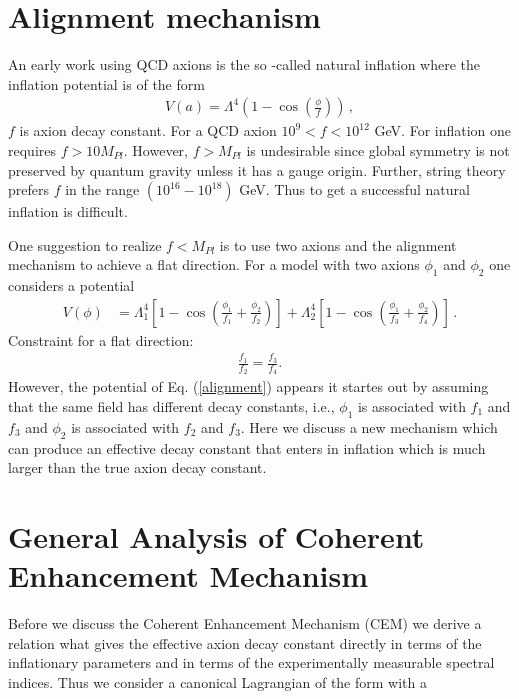 \documentclass[12pt]{article}
\begin{document}
\section{Alignment mechanism \label{sec2}}

An early work using QCD axions is the so -called natural inflation
where the inflation potential is of the form
\begin{align}
  V(a) = \Lambda^4 \left(1- \cos(\frac{\phi}{f})\right)\,,
\end{align}
$f $ is axion decay constant.
For a QCD axion $10^9 < f  <10^{12}$ GeV.
For inflation one requires $f> 10 M_{Pl}$. However,
$f>M_{Pl}$ is undesirable since  global symmetry is not preserved  by quantum gravity
unless it has a gauge origin.
Further, string theory prefers $f$ in the range $ (10^{16}-10^{18})$ GeV.
Thus to get a successful natural inflation is difficult.


One suggestion to realize $f< M_{Pl}$ is to use two axions and the alignment mechanism to achieve a flat direction.
For a model with two axions $\phi_1$ and $\phi_2$ one considers a potential
\begin{align}
  V(\phi) & = \Lambda^4_1 \left[1- \cos\left(\frac{\phi_1}{f_1} + \frac{\phi_2}{f_2}\right)\right]
  + \Lambda^4_2 \left[1- \cos\left(\frac{\phi_1}{f_3} + \frac{\phi_2}{f_4}\right)\right]\,.
  \label{alignment}
\end{align}
Constraint for a flat direction:
\begin{align}
  \frac{f_1}{f_2}= \frac{f_3}{f_4}.
\end{align}
However,  the potential of Eq. (\ref{alignment}) appears it startes out  by assuming that the same field
has different decay constants, i.e., $\phi_1$ is associated with $f_1$ and $f_3$ and $\phi_2$ is associated with
$f_2$ and $f_3$.  Here we discuss a new mechanism which can produce an effective decay constant
that enters in inflation which is much larger than  the true axion decay constant.

\section{General Analysis of Coherent Enhancement Mechanism \label{sec4}}
Before we discuss the Coherent Enhancement Mechanism (CEM) we derive a relation what gives the effective axion decay constant directly
in terms of the inflationary parameters and in terms of the experimentally measurable spectral indices.
Thus we consider a canonical Lagrangian of the form with a
\end{document}
